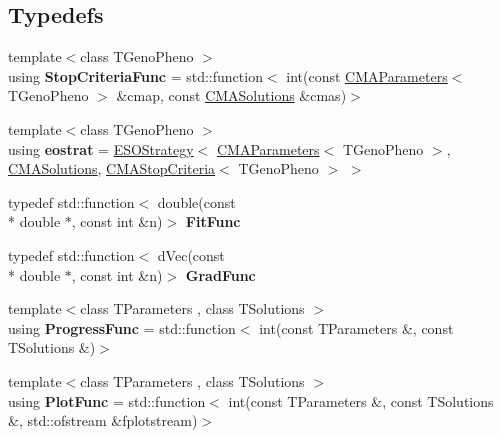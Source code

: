 \subsection*{Typedefs}
\begin{DoxyCompactItemize}
\item 
\hypertarget{namespacelibcmaes_a0ea49cc676992a7089a563279ca35df0}{{\footnotesize template$<$class T\-Geno\-Pheno $>$ }\\using {\bfseries Stop\-Criteria\-Func} = std\-::function$<$ int(const \hyperlink{classlibcmaes_1_1CMAParameters}{C\-M\-A\-Parameters}$<$ T\-Geno\-Pheno $>$ \&cmap, const \hyperlink{classlibcmaes_1_1CMASolutions}{C\-M\-A\-Solutions} \&cmas)$>$}\label{namespacelibcmaes_a0ea49cc676992a7089a563279ca35df0}

\item 
\hypertarget{namespacelibcmaes_a5d26dcaad08b23bcacac2631ba9f0f2c}{{\footnotesize template$<$class T\-Geno\-Pheno $>$ }\\using {\bfseries eostrat} = \hyperlink{classlibcmaes_1_1ESOStrategy}{E\-S\-O\-Strategy}$<$ \hyperlink{classlibcmaes_1_1CMAParameters}{C\-M\-A\-Parameters}$<$ T\-Geno\-Pheno $>$, \hyperlink{classlibcmaes_1_1CMASolutions}{C\-M\-A\-Solutions}, \hyperlink{classlibcmaes_1_1CMAStopCriteria}{C\-M\-A\-Stop\-Criteria}$<$ T\-Geno\-Pheno $>$ $>$}\label{namespacelibcmaes_a5d26dcaad08b23bcacac2631ba9f0f2c}

\item 
\hypertarget{namespacelibcmaes_aaa4766cb6addd3ad397456a779436854}{typedef std\-::function$<$ double(const \\*
double $\ast$, const int \&n)$>$ {\bfseries Fit\-Func}}\label{namespacelibcmaes_aaa4766cb6addd3ad397456a779436854}

\item 
\hypertarget{namespacelibcmaes_ae29f09cdf8b5322ac32dc9ccddecd9dd}{typedef std\-::function$<$ d\-Vec(const \\*
double $\ast$, const int \&n)$>$ {\bfseries Grad\-Func}}\label{namespacelibcmaes_ae29f09cdf8b5322ac32dc9ccddecd9dd}

\item 
\hypertarget{namespacelibcmaes_a8d4db4c2a1758fd5964499aba7cf8a9f}{{\footnotesize template$<$class T\-Parameters , class T\-Solutions $>$ }\\using {\bfseries Progress\-Func} = std\-::function$<$ int(const T\-Parameters \&, const T\-Solutions \&)$>$}\label{namespacelibcmaes_a8d4db4c2a1758fd5964499aba7cf8a9f}

\item 
\hypertarget{namespacelibcmaes_aaf23de7982c40bf628eba76801677b78}{{\footnotesize template$<$class T\-Parameters , class T\-Solutions $>$ }\\using {\bfseries Plot\-Func} = std\-::function$<$ int(const T\-Parameters \&, const T\-Solutions \&, std\-::ofstream \&fplotstream)$>$}\label{namespacelibcmaes_aaf23de7982c40bf628eba76801677b78}


\end{DoxyCompactItemize}
